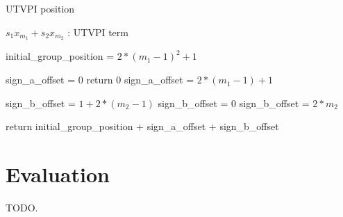 \begin{algorithm}
  \caption{UTVPI position}
  \linespread{\separationline}\selectfont
  \begin{algorithmic}[2]
     { $s_1 x_{m_1} + s_2 x_{m_2}$ : UTVPI term}

    \State initial\_group\_position = $2*(m_1 -1)^2 + 1$

    \State sign\_a\_offset = 0
    \Else
    \State return 0
    \Else
    \State sign\_a\_offset = $2*(m_1 - 1) + 1$
    \EndIf
    \EndIf
    \EndIf

    \State sign\_b\_offset = $1 + 2*(m_2 -1)$
    \Else
    \State sign\_b\_offset = 0
    \Else
    \State sign\_b\_offset = $2*m_2$
    \EndIf
    \EndIf
    \EndIf

    \State return initial\_group\_position + sign\_a\_offset + sign\_b\_offset

    \EndProcedure
  \end{algorithmic}

\end{algorithm}


\section{Evaluation}

TODO.

